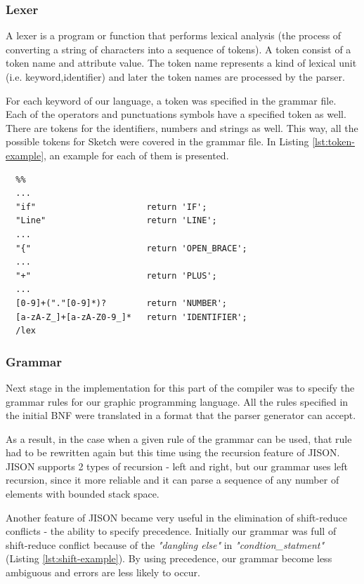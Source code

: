 \documentclass{l3proj}
\begin{document}
\subsubsection{Lexer}
A lexer is a program or function that performs lexical analysis (the process of converting a string of characters into a sequence of tokens).
A token consist of a token name and attribute value. The token name represents a kind of lexical unit (i.e. keyword,identifier) and later the token names are processed by the parser. 

For each keyword of  our language, a token was specified in the grammar file. Each of the operators and punctuations symbols have a specified token as well. There are tokens for the identifiers, numbers and strings as well. This way, all the possible tokens for Sketch were covered in the grammar file. In Listing \ref{lst:token-example}, an example for each of them is presented. 
\begin{center}
\lstset{
    basicstyle=\small\ttfamily,
    frame=lrtb,
  }
  

  
  \begin{lstlisting}[caption={Tokens of Sketch },label={lst:token-example}]
  %lex
  %% 
  ...
  "if"                      return 'IF';
  "Line"                    return 'LINE';
  ...
  "{"                       return 'OPEN_BRACE';
  ...
  "+"                       return 'PLUS';
  ... 
  [0-9]+("."[0-9]*)?        return 'NUMBER';
  [a-zA-Z_]+[a-zA-Z0-9_]*   return 'IDENTIFIER';
  /lex
  \end{lstlisting}
\end{center}

\subsubsection{Grammar}
Next stage in the implementation for this part of the compiler was to specify the grammar rules for our graphic programming language. All the rules specified in the initial BNF were translated in a format that the parser generator can accept. 

As a result, in the case when a given rule of the grammar can be used, that rule had to be rewritten again  but this time using the recursion feature of JISON. JISON supports 2 types of recursion - left and right, but our grammar uses left recursion, since it more reliable and it can parse a sequence of any number of elements with bounded stack space.


Another feature of JISON became very useful in the elimination of shift-reduce conflicts - the ability to specify precedence. Initially our grammar was full of shift-reduce conflict because of the \textit{"dangling else"}  in \textit{"condtion\_statment"} (Listing \ref{lst:shift-example}). By using precedence, our grammar become less ambiguous and errors are less likely to occur. 
\end{document}
